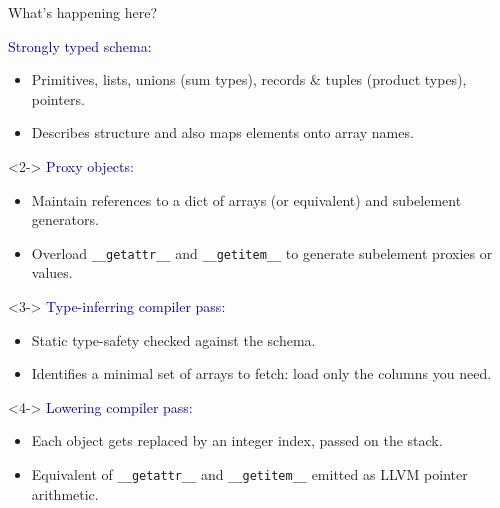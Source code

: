 \documentclass[aspectratio=169]{beamer}
\begin{document}
\begin{frame}{What's happening here?}
\vspace{0.4 cm}

\textcolor{darkblue}{\large Strongly typed schema:}
\begin{itemize}
\item Primitives, lists, unions (sum types), records \& tuples (product types), pointers.
\item Describes structure and also maps elements onto array names.
\end{itemize}

\vspace{0.25 cm}
\begin{uncoverenv}<2->
\textcolor{darkblue}{\large Proxy objects:}
\begin{itemize}
\item Maintain references to a dict of arrays (or equivalent) and subelement generators.
\item Overload {\tt\small \_\_getattr\_\_} and {\tt\small \_\_getitem\_\_} to generate subelement proxies or values.
\end{itemize}
\end{uncoverenv}

\begin{uncoverenv}<3->
\vspace{0.25 cm}
\textcolor{darkblue}{\large Type-inferring compiler pass:}
\begin{itemize}
\item Static type-safety checked against the schema.
\item Identifies a minimal set of arrays to fetch: load only the columns you need.
\end{itemize}
\end{uncoverenv}

\begin{uncoverenv}<4->
\vspace{0.25 cm}
\textcolor{darkblue}{\large Lowering compiler pass:}
\begin{itemize}
\item Each object gets replaced by an integer index, passed on the stack.
\item Equivalent of {\tt\small \_\_getattr\_\_} and {\tt\small \_\_getitem\_\_} emitted as LLVM pointer arithmetic.
\end{itemize}
\end{uncoverenv}
\end{frame}
\end{document}
